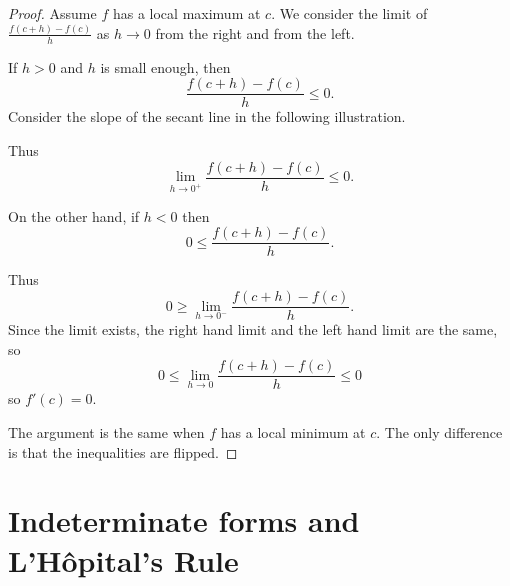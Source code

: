 \documentclass[11pt]{book}
\numberwithin{example}{chapter}
\begin{document}
\begin{proof}
Assume $f$ has a local maximum at $c$.  We consider the limit of $\frac{f(c+h)-f(c)}{h}$ as $h\to 0$ from the right and from the left.  

If $h>0$ and $h$ is small enough, then 
$$\frac{f(c+h)-f(c)}{h}\leq 0.$$
Consider the slope of the secant line in the following illustration.

\begin{center}
\end{center}

Thus $$\lim_{h\to 0^+}\frac{f(c+h)-f(c)}{h}\leq 0.$$

On the other hand, if $h<0$ then 
$$0\leq \frac{f(c+h)-f(c)}{h}.$$


\begin{center}
\end{center}


Thus $$0\geq \lim_{h\to 0^-}\frac{f(c+h)-f(c)}{h}.$$
Since the limit exists, the right hand limit and the left hand limit are the same, so 
$$0\leq \lim_{h\to 0}\frac{f(c+h)-f(c)}{h} \leq 0$$
so $f'(c)=0$.

The argument is the same when $f$ has a local minimum at $c$.  The only difference is that the inequalities are flipped.  

\end{proof}

\section{Indeterminate forms and L'H\^{o}pital's Rule}
\end{document}
